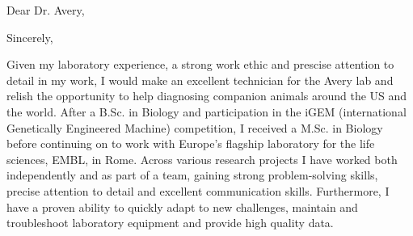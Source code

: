 \documentclass[11pt,a4paper,sans]{moderncv}
\begin{document}
\thispagestyle{titlepage}
\date{\today}
\opening{Dear Dr. Avery,}
\closing{Sincerely,}
\makelettertitle
\begin{spacing}{1.2}

Given my laboratory experience, a strong work ethic and prescise attention to detail in my work, I would make an excellent technician for the Avery lab and relish the opportunity to help diagnosing companion animals around the US and the world. After a B.Sc. in Biology and participation in the iGEM (international Genetically Engineered Machine) competition, I received a M.Sc. in Biology before continuing on to work with Europe's flagship laboratory for the life sciences, EMBL, in Rome. Across various research projects I have worked both independently and as part of a team, gaining strong problem-solving skills, precise attention to detail and excellent communication skills. Furthermore, I have a proven ability to quickly adapt to new challenges, maintain and troubleshoot laboratory equipment and provide high quality data.
\par%


\end{spacing}
\end{document}

